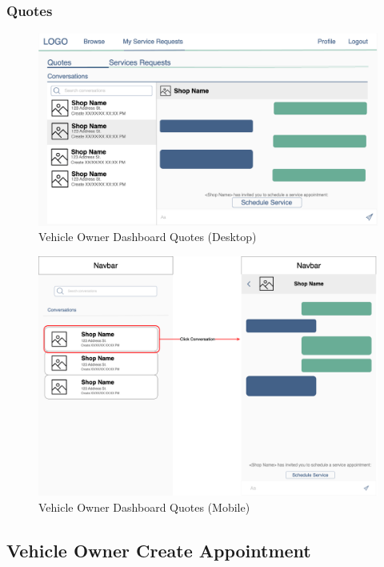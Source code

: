 \documentclass[12pt, titlepage]{article}
\begin{document}
\subsubsection{Quotes}

\begin{figure}[H]
	\centering
	\includegraphics[width=\textwidth]{mockups/Vehicle Owner Dashboard (Quotes) (Desktop).png}
	\caption{Vehicle Owner Dashboard \textemdash{} Quotes (Desktop)}
\end{figure}

\begin{figure}[H]
	\centering
	\includegraphics[width=\textwidth]{mockups/Vehicle Owner Dashboard (Quotes) (Mobile).png}
	\caption{Vehicle Owner Dashboard \textemdash{} Quotes (Mobile)}
\end{figure}

\subsection{Vehicle Owner Create Appointment}
\end{document}
